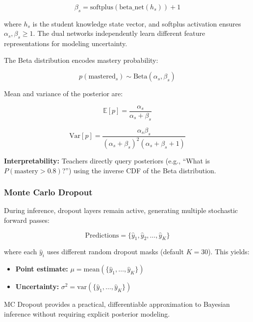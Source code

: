 \documentclass[10pt,twocolumn]{article}
\begin{document}
\begin{equation}
\beta_s = \text{softplus}(\text{beta\_net}(h_s)) + 1
\end{equation}

where $h_s$ is the student knowledge state vector, and softplus activation ensures $\alpha_s, \beta_s \geq 1$. The dual networks independently learn different feature representations for modeling uncertainty.

The Beta distribution encodes mastery probability:

\begin{equation}
p(\text{mastered}_s) \sim \text{Beta}(\alpha_s, \beta_s)
\end{equation}

Mean and variance of the posterior are:

\begin{equation}
\mathbb{E}[p] = \frac{\alpha_s}{\alpha_s + \beta_s}
\end{equation}

\begin{equation}
\text{Var}[p] = \frac{\alpha_s \beta_s}{(\alpha_s+\beta_s)^2(\alpha_s+\beta_s+1)}
\end{equation}

\textbf{Interpretability:} Teachers directly query posteriors (e.g., ``What is $P(\text{mastery} > 0.8)$?'') using the inverse CDF of the Beta distribution.

\subsubsection{Monte Carlo Dropout}
During inference, dropout layers remain active, generating multiple stochastic forward passes:

\begin{equation}
\text{Predictions} = \{\hat{y}_1, \hat{y}_2, \ldots, \hat{y}_K\}
\end{equation}

where each $\hat{y}_i$ uses different random dropout masks (default $K=30$). This yields:

\begin{itemize}
  \item \textbf{Point estimate:} $\mu = \text{mean}(\{\hat{y}_1, \ldots, \hat{y}_K\})$
  \item \textbf{Uncertainty:} $\sigma^2 = \text{var}(\{\hat{y}_1, \ldots, \hat{y}_K\})$
\end{itemize}

MC Dropout provides a practical, differentiable approximation to Bayesian inference without requiring explicit posterior modeling.
\end{document}

